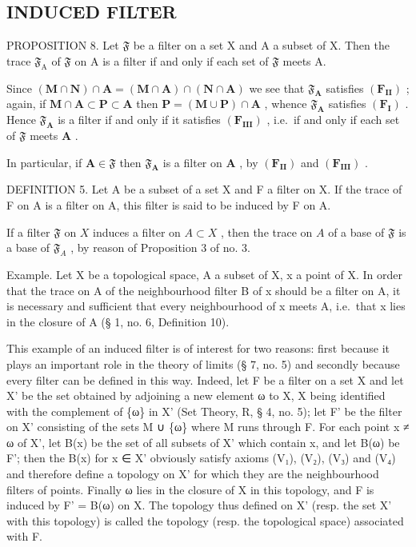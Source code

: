 \subsection{INDUCED FILTER}

PROPOSITION 8. Let \(\mathfrak{F}\) be a filter on a set X and A a subset of X. Then the trace \(\mathfrak{F}_{\mathrm{A}}\) of \(\mathfrak{F}\) on A is a filter if and only if each set of \(\mathfrak{F}\) meets A.

Since \((\mathbf{M} \cap \mathbf{N}) \cap \mathbf{A} = (\mathbf{M} \cap \mathbf{A}) \cap (\mathbf{N} \cap \mathbf{A})\) we see that \(\mathfrak{F}_{\mathbf{A}}\) satisfies \((\mathbf{F}_{\mathbf{II}})\) ; again, if \(\mathbf{M} \cap \mathbf{A} \subset \mathbf{P} \subset \mathbf{A}\) then \(\mathbf{P} = (\mathbf{M} \cup \mathbf{P}) \cap \mathbf{A}\) , whence \(\mathfrak{F}_{\mathbf{A}}\) satisfies \((\mathbf{F}_{\mathbf{I}})\) . Hence \(\mathfrak{F}_{\mathbf{A}}\) is a filter if and only if it satisfies \((\mathbf{F}_{\mathbf{III}})\) , i.e.~if and only if each set of \(\mathfrak{F}\) meets \(\mathbf{A}\) .

In particular, if \(\mathbf{A} \in \mathfrak{F}\) then \(\mathfrak{F}_{\mathbf{A}}\) is a filter on \(\mathbf{A}\) , by \((\mathbf{F}_{\mathbf{II}})\) and \((\mathbf{F}_{\mathbf{III}})\) .

DEFINITION 5. Let A be a subset of a set X and F a filter on X. If the trace of F on A is a filter on A, this filter is said to be induced by F on A.

If a filter \(\mathfrak{F}\) on \(X\) induces a filter on \(A \subset X\) , then the trace on \(A\) of a base of \(\mathfrak{F}\) is a base of \(\mathfrak{F}_A\) , by reason of Proposition 3 of no. 3.

Example. Let X be a topological space, A a subset of X, x a point of X. In order that the trace on A of the neighbourhood filter B of x should be a filter on A, it is necessary and sufficient that every neighbourhood of x meets A, i.e.~that x lies in the closure of A (§ 1, no. 6, Definition 10).

This example of an induced filter is of interest for two reasons: first because it plays an important role in the theory of limits (§ 7, no. 5) and secondly because every filter can be defined in this way. Indeed, let F be a filter on a set X and let X' be the set obtained by adjoining a new element ω to X, X being identified with the complement of \{ω\} in X' (Set Theory, R, § 4, no. 5); let F' be the filter on X' consisting of the sets M ∪ \{ω\} where M runs through F. For each point x ≠ ω of X', let B(x) be the set of all subsets of X' which contain x, and let B(ω) be F'; then the B(x) for x ∈ X' obviously satisfy axioms (V₁), (V₂), (V₃) and (V₄) and therefore define a topology on X' for which they are the neighbourhood filters of points. Finally ω lies in the closure of X in this topology, and F is induced by F' = B(ω) on X. The topology thus defined on X' (resp. the set X' with this topology) is called the topology (resp. the topological space) associated with F.

